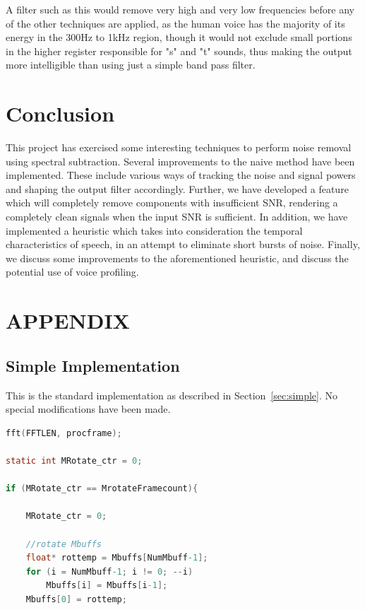 \documentclass[11pt]{article} %
\begin{document}
{A filter such as this would remove very high and very low frequencies before any of the other techniques are applied, as the human voice has the majority of its energy in the 300Hz to 1kHz region, though it would not exclude small portions in the higher register responsible for "s" and "t" sounds, thus making the output more intelligible than using just a simple band pass filter.

\section{Conclusion}

This project has exercised some interesting techniques to perform noise removal using spectral subtraction. Several improvements to the naive method have been implemented. These include various ways of tracking the noise and signal powers and shaping the output filter accordingly. Further, we have developed a feature which will completely remove components with insufficient SNR, rendering a completely clean signals when the input SNR is sufficient. In addition, we have implemented a heuristic which takes into consideration the temporal characteristics of speech, in an attempt to eliminate short bursts of noise. Finally, we discuss some improvements to the aforementioned heuristic, and discuss the potential use of voice profiling.

\clearpage

\section{APPENDIX}
\renewcommand{\thesubsection}{\Alph{subsection}}
\subsection{Simple Implementation} 
\label{app:simple}

This is the standard implementation as described in Section~\ref{sec:simple}. No special modifications have been made. 
  \begin{center}
    \begin{lstlisting}[language = C]
fft(FFTLEN, procframe);
									
static int MRotate_ctr = 0;

if (MRotate_ctr == MrotateFramecount){

	MRotate_ctr = 0;

	//rotate Mbuffs
	float* rottemp = Mbuffs[NumMbuff-1];
	for (i = NumMbuff-1; i != 0; --i)
		Mbuffs[i] = Mbuffs[i-1];
	Mbuffs[0] = rottemp;


\end{lstlisting}
\end{center}}
\end{document}
